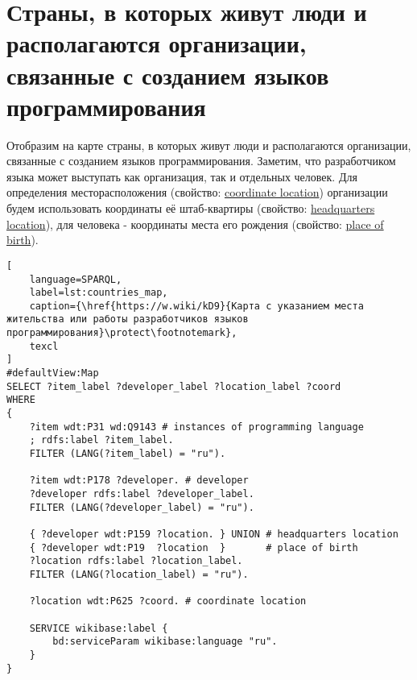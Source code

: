\section{Страны, в которых живут люди и располагаются организации, связанные с созданием языков программирования}

Отобразим на карте страны, в которых живут люди и располагаются организации, связанные с созданием языков программирования. Заметим, что разработчиком языка может выступать как организация, так и отдельных человек. Для определения месторасположения (свойство: \href{https://www.wikidata.org/wiki/Property:P625}{coordinate location}) организации будем использовать координаты её штаб-квартиры (свойство: \href{https://www.wikidata.org/wiki/Property:P159}{headquarters location}), для человека - координаты места его рождения (свойство: \href{https://www.wikidata.org/wiki/Property:P19}{place of birth}).

\begin{lstlisting}[
	language=SPARQL,
	label=lst:countries_map,
	caption={\href{https://w.wiki/kD9}{Карта с указанием места жительства или работы разработчиков языков программирования}\protect\footnotemark},
	texcl
]
#defaultView:Map
SELECT ?item_label ?developer_label ?location_label ?coord
WHERE
{
    ?item wdt:P31 wd:Q9143 # instances of programming language
    ; rdfs:label ?item_label.     
    FILTER (LANG(?item_label) = "ru"). 
  
    ?item wdt:P178 ?developer. # developer
    ?developer rdfs:label ?developer_label. 
    FILTER (LANG(?developer_label) = "ru"). 
      		
    { ?developer wdt:P159 ?location. } UNION # headquarters location
    { ?developer wdt:P19  ?location  }       # place of birth
    ?location rdfs:label ?location_label. 
    FILTER (LANG(?location_label) = "ru").
    
    ?location wdt:P625 ?coord. # coordinate location

    SERVICE wikibase:label {
        bd:serviceParam wikibase:language "ru".
    }   	
}
\end{lstlisting}

